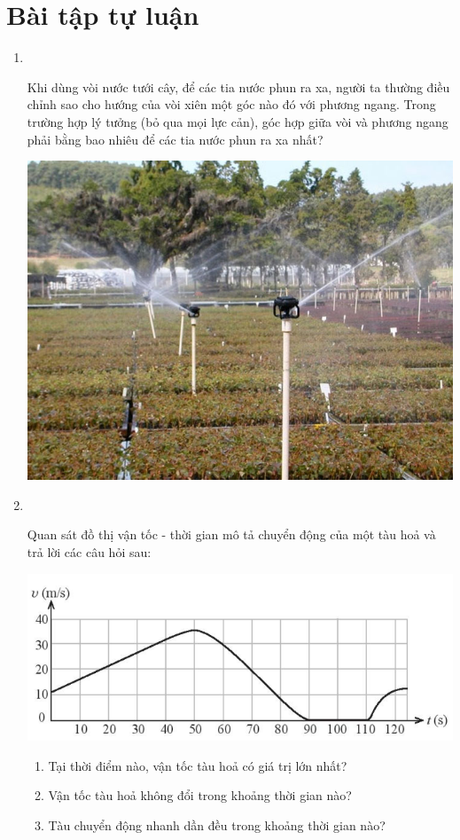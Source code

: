 \section{Bài tập tự luận}
\begin{enumerate}[label=\bfseries Bài \arabic*:,leftmargin=1.5cm]
	\item {}\\
	{Khi dùng vòi nước tưới cây, để các tia nước phun ra xa, người ta thường điều chỉnh sao cho hướng của vòi xiên một góc nào đó với phương ngang. Trong trường hợp lý tưởng (bỏ qua mọi lực cản), góc hợp giữa vòi và phương ngang phải bằng bao nhiêu để các tia nước phun ra xa nhất?
		\begin{center}
			\includegraphics[width=0.3\linewidth]{../figs/VN10-2023-PH-TP0003-11}
		\end{center}
	
}
	
	\item {}\\
	{Quan sát đồ thị vận tốc - thời gian mô tả chuyển động của một tàu hoả và trả lời các câu hỏi sau:
		\begin{center}
			\includegraphics[width=0.6\linewidth]{../figs/VN10-2023-PH-TP0003-9}
		\end{center}
	\begin{enumerate}[label=\alph*)]
		\item Tại thời điểm nào, vận tốc tàu hoả có giá trị lớn nhất?
		\item Vận tốc tàu hoả không đổi trong khoảng thời gian nào?
		\item Tàu chuyển động nhanh dần đều trong khoảng thời gian nào?
	\end{enumerate}
}




\end{enumerate}
